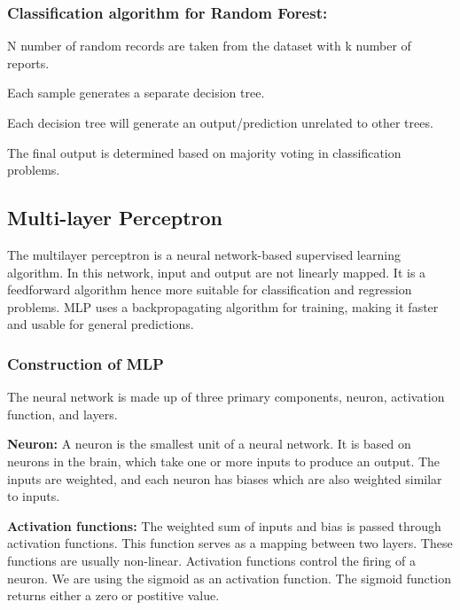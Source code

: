 \subsubsection{Classification algorithm for Random Forest:}
\begin{steps}
    \vspace{-0.5em}
    \setlength{\itemsep}{-0.2em}
    \item N number of random records are taken from the dataset with k number of reports.
    \item Each sample generates a separate decision tree.
    \item Each decision tree will generate an output/prediction unrelated to other trees.
    \item The final output is determined based on majority voting in classification problems.
    \vspace{-1em}
\end{steps}

\subsection{Multi-layer Perceptron} \label{subsec:multi_layer_perceptron}
The multilayer perceptron is a neural network-based supervised learning algorithm. In this
network, input and output are not linearly mapped. It is a feedforward algorithm hence more
suitable for classification and regression problems. MLP uses a backpropagating algorithm for
training, making it faster and usable for general predictions.

\subsubsection{Construction of MLP}
\vspace{-0.5em}
The neural network is made up of three primary components, neuron, activation function, and
layers.

\vspace{-1em}
\textbf{Neuron:}
A neuron is the smallest unit of a neural network. It is based on neurons in the brain, which
take one or more inputs to produce an output. The inputs are weighted, and each neuron has
biases which are also weighted similar to inputs.

\vspace{-1em}
\textbf{Activation functions:}
The weighted sum of inputs and bias is passed through activation functions. This function
serves as a mapping between two layers. These functions are usually non-linear. Activation
functions control the firing of a neuron. We are using the sigmoid as an activation function.
The sigmoid function returns either a zero or postitive value.

